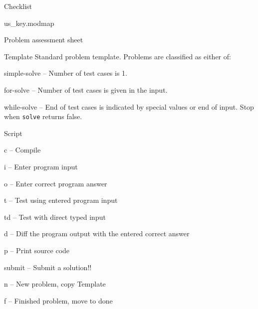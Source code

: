 \categorycontents{}


\begin{algorithm}{Checklist}
\end{algorithm}

\begin{algorithm}{us\_key.modmap}
\end{algorithm}


\begin{algorithm}{Problem assessment sheet}
\usage{}
\end{algorithm}

\begin{algorithm}{Template}
\usage{}
Standard problem template. Problems are classified as either of:
  \begin{description}
  \item{simple-solve} -- Number of test cases is 1.
  \item{for-solve} -- Number of test cases is given in the input.
  \item{while-solve} -- End of test cases is indicated by special values
    or end of input. Stop when {\tt solve} returns false.
  \end{description}
\end{algorithm}

\begin{algorithm}{Script}
  \begin{description}
  \item{c} -- Compile
  \item{i} -- Enter program input
  \item{o} -- Enter correct program answer
  \item{t} -- Test using entered program input
  \item{td} -- Test with direct typed input
  \item{d} -- Diff the program output with the entered correct answer
  \item{p} -- Print source code
  \item{submit} -- Submit a solution!!
  \item{n} -- New problem, copy Template
  \item{f} -- Finished problem, move to done
  \end{description}
\end{algorithm}

